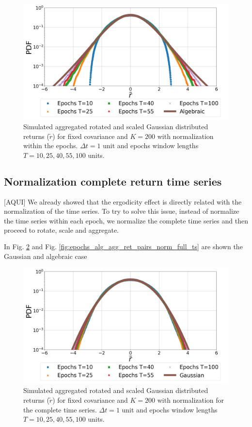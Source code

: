 \begin{figure}[htbp]
    \centering
    \includegraphics[width=0.6\columnwidth]
    {figures/06_epochs_sim_alg_agg_ret_pairs_norm.png}
    \caption{Simulated aggregated rotated and scaled Gaussian distributed
             returns ($\tilde{r}$) for fixed covariance and $K=200$ with
             normalization within the epochs. $\Delta t = 1$ unit and epochs
             window lengths $T=10, 25, 40, 55, 100$ units.}
    \label{fig:epochs_alg_agg_ret_pairs_norm}
\end{figure}

\subsection{Normalization complete return time series}
\label{subsec:norm_full_sim}

[AQUI]
We already showed that the ergodicity effect is directly related with the
normalization of the time series. To try to solve this issue, instead of
normalize the time series within each epoch, we normalize the complete time
series and then proceed to rotate, scale and aggregate.

In Fig. \ref{fig:epochs_gauss_agg_ret_pairs_norm_full_ts} and Fig.
\ref{fig:epochs_alg_agg_ret_pairs_norm_full_ts} are shown the Gaussian and
algebraic case

\begin{figure}[htbp]
    \centering
    \includegraphics[width=0.6\columnwidth]
    {figures/06_epochs_sim_gauss_ts_norm.png}
    \caption{Simulated aggregated rotated and scaled Gaussian distributed
             returns ($\tilde{r}$) for fixed covariance and $K=200$ with
             normalization for the complete time series. $\Delta t = 1$ unit
             and epochs window lengths $T=10, 25, 40, 55, 100$ units.}
    \label{fig:epochs_gauss_agg_ret_pairs_norm_full_ts}
\end{figure}

